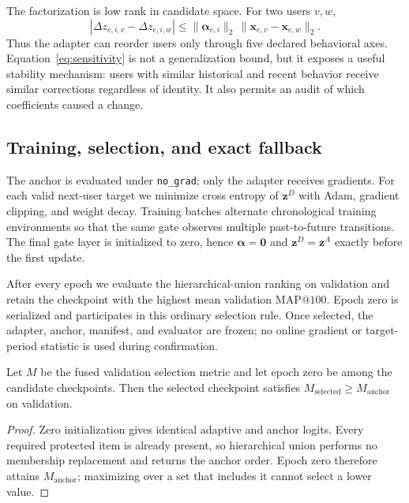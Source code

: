\documentclass[sigconf,anonymous,review]{acmart}
\makeatletter
\newcommand{\mapk}{\mathrm{MAP}@100}
\makeatother
\begin{document}
The factorization is low rank in candidate space. For two users $v,w$,
\begin{equation}
|\Delta z_{e,i,v}-\Delta z_{e,i,w}|
\le \|\boldsymbol\alpha_{e,i}\|_2\,\|\mathbf x_{e,v}-\mathbf x_{e,w}\|_2.
\label{eq:sensitivity}
\end{equation}
Thus the adapter can reorder users only through five declared behavioral axes. Equation~\ref{eq:sensitivity} is not a generalization bound, but it exposes a useful stability mechanism: users with similar historical and recent behavior receive similar corrections regardless of identity. It also permits an audit of which coefficients caused a change.

\subsection{Training, selection, and exact fallback}
The anchor is evaluated under \texttt{no\_grad}; only the adapter receives gradients. For each valid next-user target we minimize cross entropy of $\mathbf z^D$ with Adam, gradient clipping, and weight decay. Training batches alternate chronological training environments so that the same gate observes multiple past-to-future transitions. The final gate layer is initialized to zero, hence $\boldsymbol\alpha=\mathbf 0$ and $\mathbf z^D=\mathbf z^A$ exactly before the first update.

After every epoch we evaluate the hierarchical-union ranking on validation and retain the checkpoint with the highest mean validation $\mapk$. Epoch zero is serialized and participates in this ordinary selection rule. Once selected, the adapter, anchor, manifest, and evaluator are frozen; no online gradient or target-period statistic is used during confirmation.

\begin{proposition}
Let $M$ be the fused validation selection metric and let epoch zero be among the candidate checkpoints. Then the selected checkpoint satisfies $M_{\mathrm{selected}}\ge M_{\mathrm{anchor}}$ on validation.
\end{proposition}
\begin{proof}
Zero initialization gives identical adaptive and anchor logits. Every required protected item is already present, so hierarchical union performs no membership replacement and returns the anchor order. Epoch zero therefore attains $M_{\mathrm{anchor}}$; maximizing over a set that includes it cannot select a lower value.
\end{proof}
\end{document}
